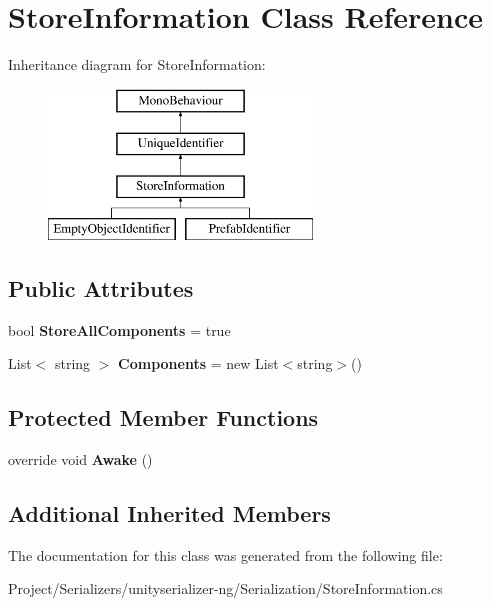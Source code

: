 \hypertarget{class_store_information}{}\section{Store\+Information Class Reference}
\label{class_store_information}
Inheritance diagram for Store\+Information\+:\begin{figure}[H]
\begin{center}
\leavevmode
\includegraphics[height=4.000000cm]{class_store_information}
\end{center}
\end{figure}
\subsection*{Public Attributes}
\begin{DoxyCompactItemize}
\item 
\mbox{\label{class_store_information_aa4732e6bb5c4dcff1a7d7482c785b1f5}} 
bool {\bfseries Store\+All\+Components} = true
\item 
\mbox{\label{class_store_information_a0b1aa5065cb278253bc2f2cbff36bd6f}} 
List$<$ string $>$ {\bfseries Components} = new List$<$string$>$()
\end{DoxyCompactItemize}
\subsection*{Protected Member Functions}
\begin{DoxyCompactItemize}
\item 
\mbox{\label{class_store_information_a4a751814bad3a0171ba3aaaa19a6c8e7}} 
override void {\bfseries Awake} ()
\end{DoxyCompactItemize}
\subsection*{Additional Inherited Members}


The documentation for this class was generated from the following file\+:\begin{DoxyCompactItemize}
\item 
Project/\+Serializers/unityserializer-\/ng/\+Serialization/Store\+Information.\+cs\end{DoxyCompactItemize}
